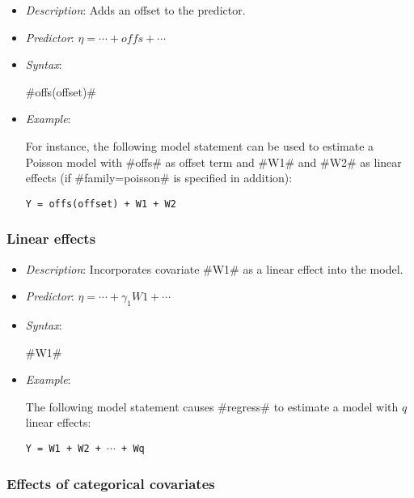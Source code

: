 \begin{itemize}
\item[] {\em Description}: Adds an offset to the predictor.
\item[] {\em Predictor}: $\eta =  \cdots + offs + \cdots$
\item[] {\em Syntax}:

#offs(offset)#
\item[] {\em Example}:

For instance, the following model statement can be used to estimate
a Poisson model with #offs# as offset term and #W1# and #W2# as
linear effects (if #family=poisson# is specified in addition):

\texttt{Y = offs(offset) + W1 + W2}
\end{itemize}

\subsubsection*{Linear effects}

\begin{itemize}
\item[] {\em Description}: Incorporates covariate #W1# as a linear effect into the model.
\item[] {\em Predictor}: $\eta =  \cdots + \gamma_1 W1 + \cdots$
\item[] {\em Syntax}:

#W1#
\item[] {\em Example}:

The following model statement causes #regress# to estimate a model
with $q$ linear effects:

\texttt{Y = W1 + W2 + $\cdots$ + Wq}
\end{itemize}

\subsubsection*{Effects of categorical covariates}

